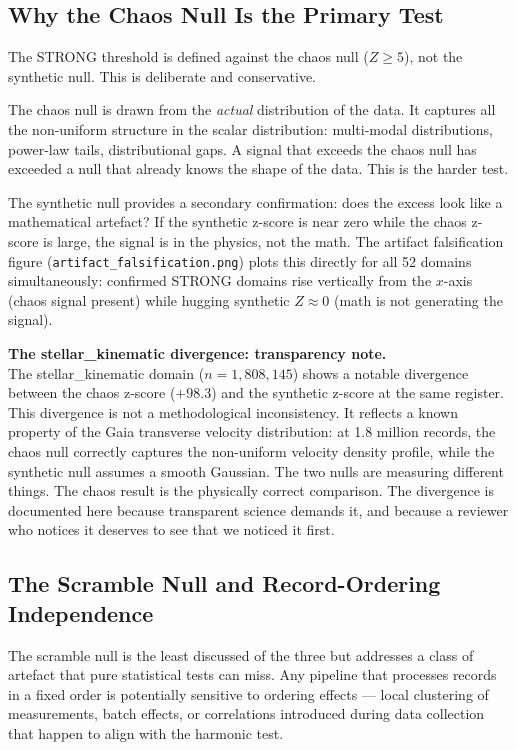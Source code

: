 \documentclass[11pt, letterpaper, openany]{book}
\begin{document}
\subsection*{Why the Chaos Null Is the Primary Test}

The STRONG threshold is defined against the chaos null ($Z \geq 5$), not the
synthetic null. This is deliberate and conservative.

The chaos null is drawn from the \textit{actual} distribution of the data.
It captures all the non-uniform structure in the scalar distribution:
multi-modal distributions, power-law tails, distributional gaps. A signal
that exceeds the chaos null has exceeded a null that already knows the shape
of the data. This is the harder test.

The synthetic null provides a secondary confirmation: does the excess look
like a mathematical artefact? If the synthetic z-score is near zero while
the chaos z-score is large, the signal is in the physics, not the math.
The artifact falsification figure (\texttt{artifact\_falsification.png})
plots this directly for all 52 domains simultaneously: confirmed STRONG
domains rise vertically from the $x$-axis (chaos signal present) while
hugging synthetic $Z \approx 0$ (math is not generating the signal).

\begin{warningbox}
\textbf{The stellar\_kinematic divergence: transparency note.}\\[0.5em]
The stellar\_kinematic domain ($n=1{,}808{,}145$) shows a notable divergence
between the chaos z-score ($+98.3$) and the synthetic z-score at the same
register. This divergence is not a methodological inconsistency. It reflects
a known property of the Gaia transverse velocity distribution: at 1.8 million
records, the chaos null correctly captures the non-uniform velocity density
profile, while the synthetic null assumes a smooth Gaussian. The two nulls
are measuring different things. The chaos result is the physically correct
comparison. The divergence is documented here because transparent science
demands it, and because a reviewer who notices it deserves to see that we
noticed it first.
\end{warningbox}

\subsection*{The Scramble Null and Record-Ordering Independence}

The scramble null is the least discussed of the three but addresses a
class of artefact that pure statistical tests can miss. Any pipeline that
processes records in a fixed order is potentially sensitive to ordering
effects --- local clustering of measurements, batch effects, or correlations
introduced during data collection that happen to align with the harmonic
test.
\end{document}
